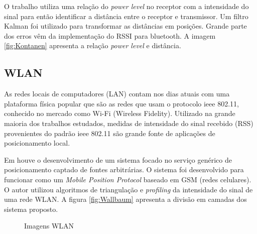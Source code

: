 
O trabalho \cite{Kotanen2003} utiliza uma relação do \textit{power level} no receptor com a intensidade do sinal para então identificar a distância entre o receptor e transmissor. Um filtro Kalman foi utilizado para  transformar as distâncias em posições. Grande parte dos erros vêm da implementação do RSSI para bluetooth. A imagem \ref{fig:Kontanen} apresenta a relação \textit{power level} e distância.


\subsection*{WLAN}
As redes locais de computadores (LAN) contam nos dias atuais com uma plataforma física popular que são as redes que usam o protocolo ieee 802.11, conhecido no mercado como Wi-Fi (Wireless Fidelity). Utilizado na grande maioria dos trabalhos estudados, medidas de intensidade do sinal recebido (RSS) provenientes do padrão ieee 802.11 são grande fonte de aplicações de posicionamento local.

Em \cite{Wallbaum2002} houve o desenvolvimento de um sistema focado no serviço genérico de posicionamento captado de fontes arbitrárias. O sistema foi desenvolvido para funcionar como um \textit{Mobile Position Protocol} baseado em GSM (redes celulares). O autor utilizou algoritmos de triangulação e \textit{profiling} da intensidade do sinal de uma rede WLAN. A figura \ref{fig:Wallbaum} apresenta a divisão em camadas dos sistema proposto.

\begin{figure}
\centering
{}
\caption{Imagens WLAN}
\end{figure}

